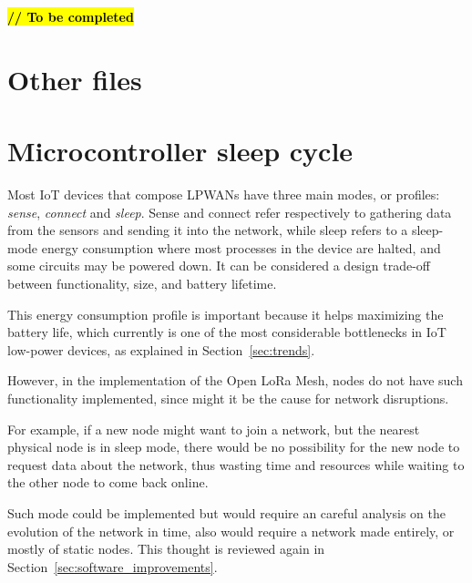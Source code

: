 		\textbf{\textcolor{red}{\hl{// To be completed}}}
		
		
		
		
	\section{Other files}
	
		
	\section{Microcontroller sleep cycle}\label{sec:sleep}
	
		Most IoT devices that compose LPWANs have three main modes, or profiles: \textit{sense}, \textit{connect} and \textit{sleep}.
		Sense and connect refer respectively to gathering data from the sensors and sending it into the network, while sleep refers to a sleep-mode energy consumption where most processes in the device are halted, and some circuits may be powered down.
		It can be considered a design trade-off between functionality, size, and battery lifetime.
		
		This energy consumption profile is important because it helps maximizing the battery life, which currently is one of the most considerable bottlenecks in IoT low-power devices, as explained in Section~\ref{sec:trends}.
		
		However, in the implementation of the Open LoRa Mesh, nodes do not have such functionality implemented, since might it be the cause for network disruptions.
		
		For example, if a new node might want to join a network, but the nearest physical node is in sleep mode, there would be no possibility for the new node to request data about the network, thus wasting time and resources while waiting to the other node to come back online.
		
		Such mode could be implemented but would require an careful analysis on the evolution of the network in time, also would require a network made entirely, or mostly of static nodes.
		This thought is reviewed again in Section~\ref{sec:software_improvements}.
			
